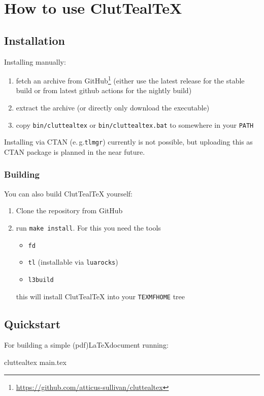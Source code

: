 \documentclass[a4paper, 11pt]{scrartcl}
\newcommand\eg{e.\,g.\xspace}
\newcommand\CluttealTeX{ClutTeal\TeX\xspace}
\begin{document}
\section{How to use \CluttealTeX}
\subsection{Installation}
Installing manually:
\begin{enumerate}
	\renewcommand{\theenumi}{\arabic{enumi}}
	\item fetch an archive from GitHub\footnote{\url{https://github.com/atticus-sullivan/cluttealtex}}
		(either use the latest release for the stable build or from latest github actions for the nightly build)
	\item extract the archive (or directly only download the executable)
	\item copy \texttt{bin/cluttealtex} or \texttt{bin/cluttealtex.bat} to somewhere in your \texttt{PATH}
\end{enumerate}

Installing via CTAN (\eg \texttt{tlmgr}) currently is not possible, but uploading this as CTAN package is planned in the near future.

\subsubsection{Building}
You can also build \CluttealTeX yourself:
\begin{enumerate}
	\renewcommand{\theenumi}{\arabic{enumi}}
	\item Clone the repository from GitHub
	\item run \texttt{make install}. For this you need the tools
		\begin{itemize}
			\item \texttt{fd}
			\item \texttt{tl} (installable via \texttt{luarocks})
			\item \texttt{l3build}
		\end{itemize}
		this will install \CluttealTeX into your \texttt{TEXMFHOME} tree
\end{enumerate}

\subsection{Quickstart}
For building a simple (pdf)\LaTeX document running:
\begin{boxcmd}
  cluttealtex main.tex
\end{boxcmd}
\end{document}
